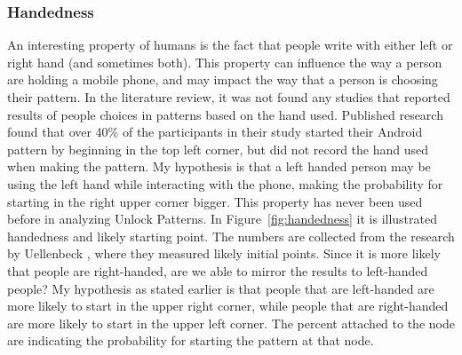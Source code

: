       \subsubsection*{Handedness} 
      An interesting property of humans is the fact that people write with either left or right hand (and sometimes both). This property can influence the way a person are holding a mobile phone, and may impact the way that a person is choosing their pattern. In the literature review, it was not found any studies that reported results of people choices in patterns based on the hand used. Published research \cite{Uellenbeck} found that over 40\% of the participants in their study started their Android pattern by beginning in the top left corner, but did not record the hand used when making the pattern. My hypothesis is that a left handed person may be using the left hand while interacting with the phone, making the probability for starting in the right upper corner bigger. This property has never been used before in analyzing Unlock Patterns. In Figure~\ref{fig:handedness} it is illustrated handedness and likely starting point. The numbers are collected from the research by Uellenbeck \cite{Uellenbeck}, where they measured likely initial points. Since it is more likely that people are right-handed, are we able to mirror the results to left-handed people? My hypothesis as stated earlier is that people that are left-handed are more likely to start in the upper right corner, while people that are right-handed are more likely to start in the upper left corner. The percent attached to the node are indicating the probability for starting the pattern at that node. 

